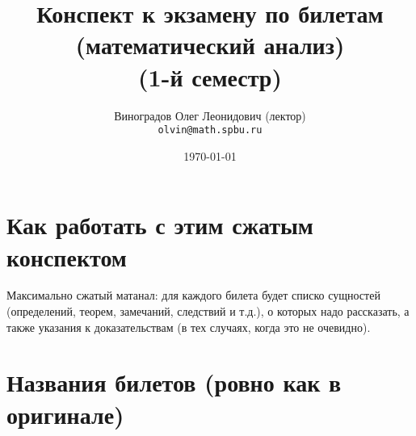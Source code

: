 \documentclass[12pt, a4paper]{article}
\title{Конспект к экзамену по билетам (математический анализ) \\(1-й семестр)}
\author{
  \vova
  \and
  Виноградов Олег Леонидович (лектор)\\
  \texttt{olvin@math.spbu.ru}
}
\date{\today}
\begin{document}
\maketitle
\newpage
\tableofcontents
\newpage


\section{Как работать с этим сжатым конспектом}

Максимально сжатый матанал: 
для каждого билета будет списко сущностей 
(определений, теорем, замечаний, следствий и т.д.),
о которых надо рассказать, а также указания к доказательствам
(в тех случаях, когда это не очевидно).

\section{Названия билетов (ровно как в оригинале)}
\end{document}
